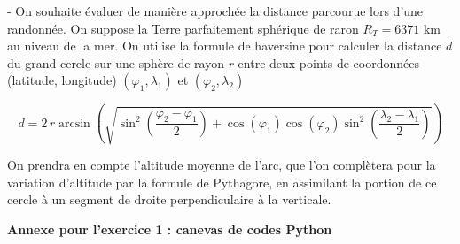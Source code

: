 \documentclass[11pt,a4paper]{article}
\begin{document}
\begin{Exercise}[title={Randonnée},origin={\bac \; d'après {\sc ccmp 2021 - pc, pc psi} (Partie 1)}]
\medskip
\leftskip -\QuestionIndent
On souhaite évaluer de manière approchée la distance parcourue lors d'une randonnée. On suppose la Terre parfaitement sphérique de raron $R_T = 6371$ km au niveau de la mer. On utilise la formule de haversine pour calculer la distance $d$ du grand cercle sur une sphère de rayon $r$ entre deux points de coordonnées (latitude, longitude) $(\varphi_1, \lambda_1)$ et $(\varphi_2, \lambda_2)$

$$ d = 2\, r \arcsin \left(\sqrt{\sin^2\left( \frac{\varphi_2-\varphi_1}{2}\right) + \cos({\varphi_1})\cos({\varphi_2})\sin^2\left( \frac{\lambda_2-\lambda_1}{2}\right) }\right) $$

On prendra en compte l'altitude moyenne de l'arc, que l'on complètera pour la variation d'altitude par la formule de Pythagore, en assimilant la portion de ce cercle à un segment de droite perpendiculaire à la verticale.

\leftskip 0pt


\pagebreak

\begin{center}{\textbf{\large Annexe pour l'exercice 1 : canevas de codes Python}}\end{center}

\end{Exercise}
\end{document}
